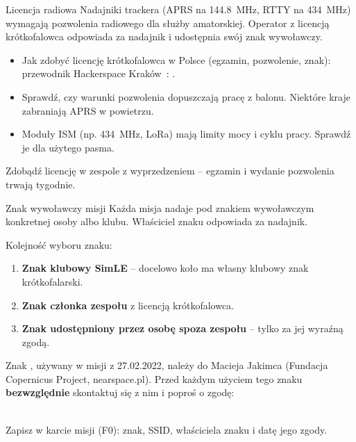 \begin{sekcja}{Licencja radiowa}
Nadajniki trackera (APRS na \SI{144.8}{MHz}, RTTY na \SI{434}{MHz}) wymagają pozwolenia radiowego dla służby amatorskiej. Operator z licencją krótkofalowca odpowiada za nadajnik i udostępnia swój znak wywoławczy.

\begin{itemize}
  \item Jak zdobyć licencję krótkofalowca w Polsce (egzamin, pozwolenie, znak): przewodnik Hackerspace Kraków~\cite{faqradiowe}: .
  \item Sprawdź, czy warunki pozwolenia dopuszczają pracę z balonu. Niektóre kraje zabraniają APRS w powietrzu.
  \item Moduły ISM (np. \SI{434}{MHz}, LoRa) mają limity mocy i cyklu pracy. Sprawdź je dla użytego pasma.
\end{itemize}

\begin{wskazowka}Zdobądź licencję w zespole z wyprzedzeniem -- egzamin i wydanie pozwolenia trwają tygodnie.\end{wskazowka}
\end{sekcja}

\begin{podsekcja}{Znak wywoławczy misji}
Każda misja nadaje pod znakiem wywoławczym konkretnej osoby albo klubu. Właściciel znaku odpowiada za nadajnik.

Kolejność wyboru znaku:
\begin{enumerate}
  \item \textbf{Znak klubowy SimLE} -- docelowo koło ma własny klubowy znak krótkofalarski.\par
  {\raggedright{}\par{}\par}
  \item \textbf{Znak członka zespołu} z licencją krótkofalowca.
  \item \textbf{Znak udostępniony przez osobę spoza zespołu} -- tylko za jej wyraźną zgodą.
\end{enumerate}

\begin{uwaga}Znak , używany w misji z 27.02.2022, należy do Macieja Jakimca (Fundacja Copernicus Project, nearspace.pl). Przed każdym użyciem tego znaku \textbf{bezwzględnie} skontaktuj się z nim i poproś o zgodę:\\
\\
\end{uwaga}

Zapisz w karcie misji (F0): znak, SSID, właściciela znaku i datę jego zgody.
\end{podsekcja}

